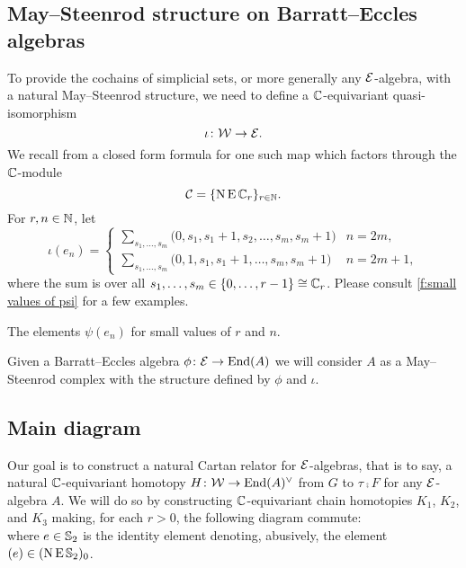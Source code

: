 \subsection{May--Steenrod structure on Barratt--Eccles algebras}\label{ss:may-steenrod on barratt-eccles}

To provide the cochains of simplicial sets, or more generally any $\mathcal{E}$-algebra, with a natural May--Steenrod structure, we need to define a $\mathbb{C}$-equivariant quasi-isomorphism
\[
\iota \colon \mathcal{W} \to \mathcal{E}.
\]
We recall from \cite{medina2021may_st} a closed form formula for one such map which factors through the $\mathbb{C}$-module
\[
\mathcal{C} = \{\operatorname{N}\operatorname{E}\mathbb{C}_r\}_{r\in\mathbb{N}}.
\]
For $r,n\in\mathbb{N}$, let
\begin{equation*}
	\iota(e_{n}) =
	\begin{cases}
		\displaystyle{\sum_{s_1, \dots, s_m}} \big(0, {s_1}, {s_1+1}, {s_2}, \dots, {s_{m}}, {s_{m}+1} \big) & n = 2m, \\
		\displaystyle{\sum_{s_1, \dots, s_m}} \big(0, 1, {s_1}, {s_1+1}, \dots, {s_{m}}, {s_{m}+1} \big) & n = 2m+1,
	\end{cases}
\end{equation*}
where the sum is over all $s_1, \dots, s_m \in \{0, \dots, r-1\} \cong \mathbb{C}_r$.
Please consult \cref{f:small values of psi} for a few examples.

\begin{table}
	\centering
	
	\caption{The elements $\psi(e_n)$ for small values of $r$ and $n$.}
	\label{f:small values of psi}
\end{table}

Given a Barratt--Eccles algebra $\phi \colon \mathcal{E} \to \mathrm{End}(A)$ we will consider $A$ as a May--Steenrod complex with the structure defined by $\phi$ and $\iota$.

\subsection{Main diagram}

Our goal is to construct a natural Cartan relator for $\mathcal{E}$-algebras, that is to say, a natural $\mathbb{C}$-equivariant homotopy $H \colon \mathcal{W} \to \mathrm{End}(A)^\vee$ from $G$ to $\tau \comp F$ for any $\mathcal{E}$-algebra $A$.
We will do so by constructing $\mathbb{C}$-equivariant chain homotopies $K_1$, $K_2$, and $K_3$ making, for each $r>0$, the following diagram commute:
\begin{equation}\label{d:big diagram}
	
\end{equation}
where $e \in \mathbb{S}_2$ is the identity element denoting, abusively, the element $(e) \in (\operatorname{N}\operatorname{E}\mathbb{S}_2)_0$.


